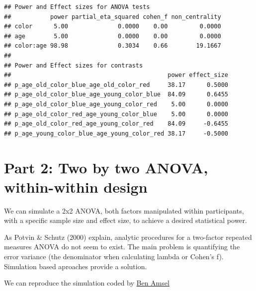 \documentclass[]{book}
\begin{document}
\begin{verbatim}
## Power and Effect sizes for ANOVA tests
##           power partial_eta_squared cohen_f non_centrality
## color      5.00              0.0000    0.00         0.0000
## age        5.00              0.0000    0.00         0.0000
## color:age 98.98              0.3034    0.66        19.1667
## 
## Power and Effect sizes for contrasts
##                                            power effect_size
## p_age_old_color_blue_age_old_color_red     38.17      0.5000
## p_age_old_color_blue_age_young_color_blue  84.09      0.6455
## p_age_old_color_blue_age_young_color_red    5.00      0.0000
## p_age_old_color_red_age_young_color_blue    5.00      0.0000
## p_age_old_color_red_age_young_color_red    84.09     -0.6455
## p_age_young_color_blue_age_young_color_red 38.17     -0.5000
\end{verbatim}

\hypertarget{part-2-two-by-two-anova-within-within-design}{%
\section{Part 2: Two by two ANOVA, within-within design}\label{part-2-two-by-two-anova-within-within-design}}

We can simulate a 2x2 ANOVA, both factors manipulated within participants, with a specific sample size and effect size, to achieve a desired statistical power.

As Potvin \& Schutz (2000) explain, analytic procedures for a two-factor repeated measures ANOVA do not seem to exist. The main problem is quantifying the error variance (the denominator when calculating lambda or Cohen's f). Simulation based aproaches provide a solution.

We can reproduce the simulation coded by \href{https://cognitivedatascientist.com/2015/12/14/power-simulation-in-r-the-repeated-measures-anova-5/}{Ben Amsel}
\end{document}
